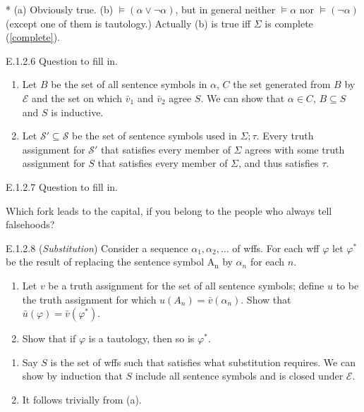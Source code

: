 * (a) Obviously true. (b) $\vDash(\alpha\vee\neg \alpha)$, but in general neither $\vDash \alpha$ nor $\vDash (\neg \alpha)$ (except one of them is tautology.) Actually (b) is true iff $\Sigma$ is complete (\ref{complete}).

\begin{exercise}{E.1.2.6}
  Question to fill in.
\end{exercise}

\begin{enumerate}[label=(\alph*)]
  \item Let $B$ be the set of all sentence symbols in $\alpha$, $C$ the set generated from $B$ by $\mathcal{E}$ and the set on which $\bar{v}_1$ and $\bar{v}_2$ agree $S$. We can show that $\alpha\in C$, $B\subseteq S$ and $S$ is inductive.
  \item Let $\mathcal{S}'\subseteq \mathcal{S}$ be the set of sentence symbols used in $\Sigma;\tau$. Every truth assignment for $\mathcal{S}'$ that satisfies every member of $\Sigma$ agrees with some truth assignment for $S$ that satisfies every member of $\Sigma$, and thus satisfies $\tau$.
\end{enumerate}

\begin{exercise}{E.1.2.7}
  Question to fill in.
\end{exercise}

Which fork leads to the capital, if you belong to the people who always tell falsehoods?

\begin{exercise}{E.1.2.8}
  (\textit{Substitution}) Consider a sequence $\alpha_1,\alpha_2,\dots$ of wffs. For each wff $\varphi$ let $\varphi^*$ be the result of replacing the sentence symbol $\mathrm{A_n}$ by $\alpha_n$ for each $n$.\begin{enumerate}[label=(\alph*)]
    \item Let $v$ be a truth assignment for the set of all sentence symbols; define $u$ to be the truth assignment for which $u(A_n)=\bar{v}(\alpha_n)$. Show that $\bar{u}(\varphi)=\bar{v}(\varphi^*)$.
    \item Show that if $\varphi$ is a tautology, then so is $\varphi^*$.\qedhere
  \end{enumerate}
\end{exercise}

\begin{enumerate}[label=(\alph*)]
  \item Say $S$ is the set of wffs such that satisfies what substitution requires. We can show by induction that $S$ include all sentence symbols and is closed under $\mathcal{E}$.
  \item It follows trivially from (a).
\end{enumerate}

